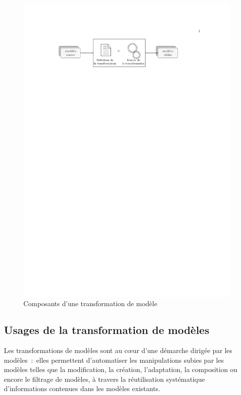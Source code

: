 \begin{figure}[!ht]
    \includegraphics[trim= 100 635 400 100]{figures/3_etat_de_l_art_IDM/composants_transfo.pdf} %
    \caption{Composants d'une transformation de modèle}
    \label{fig:composantTransfo}
\end{figure}

\subsection{Usages de la transformation de modèles }
Les transformations de modèles sont au cœur d'une démarche dirigée par les 
modèles~:~elles permettent d'automatiser les manipulations subies par les 
modèles telles que la modification, la création, l'adaptation, la composition ou 
encore le filtrage de modèles, à travers la réutilisation systématique 
d'informations contenues dans les modèles existants. 


